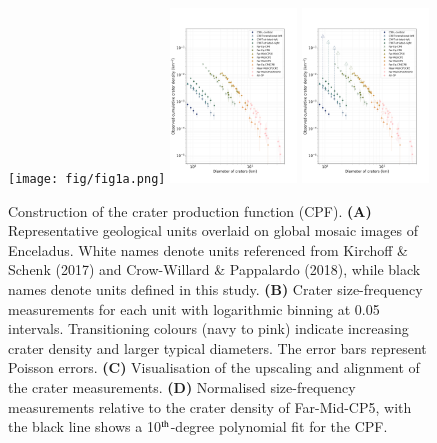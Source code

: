 \documentclass[preprint,11pt,3p,times,authoryear]{elsarticle}
\begin{document}
{\begin{figure}[ht!]
    \centering
    \texttt{[image: fig/fig1a.png]}
    \includegraphics[width=0.3\textwidth]{fig/fig1b.png}
    \includegraphics[width=0.3\textwidth]{fig/fig1_arrow.png}
    \caption{Construction of the crater production function (CPF).
        \textbf{(A)} Representative geological units overlaid on global mosaic images of Enceladus. White names denote units referenced from Kirchoff \& Schenk (2017) and Crow-Willard \& Pappalardo (2018), while black names denote units defined in this study.
        \textbf{(B)} Crater size-frequency measurements for each unit with logarithmic binning at 0.05 intervals. Transitioning colours (navy to pink) indicate increasing crater density and larger typical diameters. The error bars represent Poisson errors.
        \textbf{(C)} Visualisation of the upscaling and alignment of the crater measurements.
        \textbf{(D)} Normalised size-frequency measurements relative to the crater density of Far-Mid-CP5, with the black line shows a 10$^{\rm th}$-degree polynomial fit for the CPF.}
    \label{fig:age}
\end{figure}

}
\end{document}
